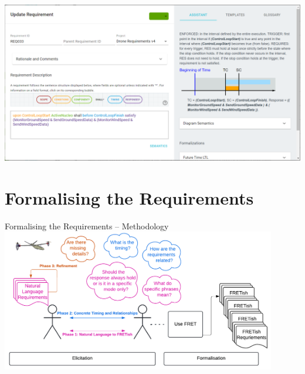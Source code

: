 \documentclass[11pt, aspectratio=169, table]{beamer}
\begin{document}
\begin{frame}
\centering
\includegraphics[width=\textwidth]{images/Drone-REQ033.png}
\end{frame}

\section{Formalising the Requirements}

\begin{frame}{Formalising the Requirements -- Methodology}
\centering
\includegraphics[width=0.9\textwidth]{images/processfinal.pdf}
\end{frame}
\end{document}

